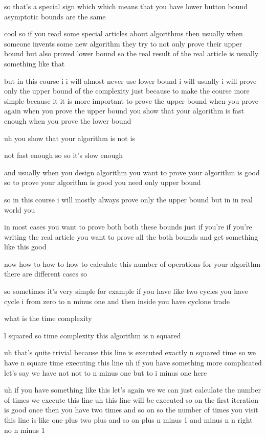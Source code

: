 so that's a special sign which which means that you have lower button bound asymptotic bounds are the same

cool so if you read some special articles about algorithms then usually when someone invents some new algorithm they try to not only prove their upper bound but also proved lower bound so the real result of the real article is usually something like that

but in this course i i will almost never use lower bound i will usually i will prove only the upper bound of the complexity just because to make the course more simple because it it is more important to prove the upper bound when you prove again when you prove the upper bound you show that your algorithm is fast enough when you prove the lower bound

uh you show that your algorithm is not is

not fast enough so so it's slow enough

and usually when you design algorithm you want to prove your algorithm is good so to prove your algorithm is good you need only upper bound

so in this course i will mostly always prove only the upper bound but in in real world you

in most cases you want to prove both both these bounds just if you're if you're writing the real article you want to prove all the both bounds and get something like this good

now how to how to how to calculate this number of operations for your algorithm there are different cases so

so sometimes it's very simple for example if you have like two cycles you have cycle i from zero to n minus one and then inside you have cyclone trade

what is the time complexity

l squared so time complexity this algorithm is n squared

uh that's quite trivial because this line is executed exactly n squared time so we have n square time executing this line uh if you have something more complicated let's say we have not not to n minus one but to i minus one here

uh if you have something like this let's again we we can just calculate the number of times we execute this line uh this line will be executed so on the first iteration is good once then you have two times and so on so the number of times you visit this line is like one plus two plus and so on plus n minus 1 and minus n n right no n minus 1

